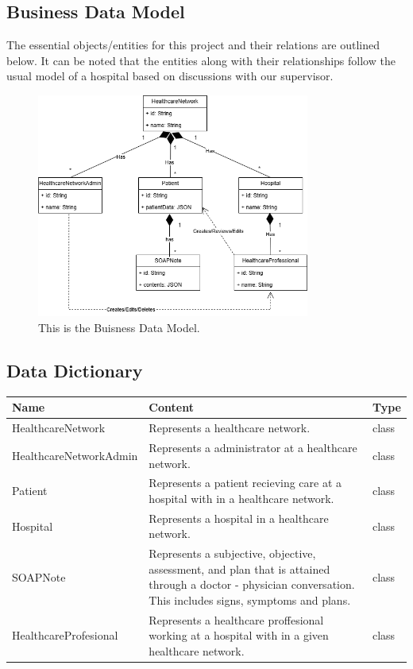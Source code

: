 \documentclass[12pt]{article}
\begin{document}
\subsection{Business Data Model}

The essential objects/entities for this project and their relations are outlined below. It can be noted that the entities along with their relationships follow the usual model of a hospital based on discussions with our supervisor.

\begin{figure}[H]
  \includegraphics[width=0.8\textwidth]{DataModel.png}
  \caption{This is the Buisness Data Model.}
\end{figure}

\subsection{Data Dictionary}
\begin{center}
\begin{tabular}{ | m{15em} | m{20em}| m{5em} | } 
  \hline
  \textbf{Name}& \textbf{Content} & \textbf{Type} \\ 
  \hline
  HealthcareNetwork & Represents a healthcare network. & class \\ 
  \hline
  HealthcareNetworkAdmin & Represents a administrator at a healthcare network. & class \\ 
  \hline
  Patient & Represents a patient recieving care at a hospital with in a healthcare network. & class \\ 
  \hline
  Hospital & Represents a hospital in a healthcare network. & class \\ 
  \hline
  SOAPNote & Represents a subjective, objective, assessment, and plan that is attained through a doctor - physician conversation. This includes signs, symptoms and plans.& class \\ 
  \hline
  HealthcareProfesional & Represents a healthcare proffesional working at a hospital with in a given healthcare network.& class \\ 
  \hline
\end{tabular}
\end{center}
\end{document}
